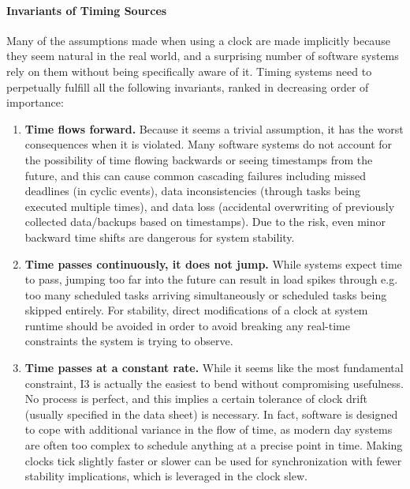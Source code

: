 \paragraph*{Invariants of Timing Sources} Many of the assumptions made when using a clock are made implicitly because they seem natural in the real world, and a surprising number of software systems rely on them without being specifically aware of it. Timing systems need to perpetually fulfill all the following invariants, ranked in decreasing order of importance:

\begin{enumerate}[label=I\arabic*.]
    \item \textbf{Time flows forward.} Because it seems a trivial assumption, it has the worst consequences when it is violated. Many software systems do not account for the possibility of time flowing backwards or seeing timestamps from the future, and this can cause common cascading failures including missed deadlines (in cyclic events), data inconsistencies (through tasks being executed multiple times), and data loss (accidental overwriting of previously collected data/backups based on timestamps). Due to the risk, even minor backward time shifts are dangerous for system stability.
    \item \textbf{Time passes continuously, it does not jump.} While systems expect time to pass, jumping too far into the future can result in load spikes through e.g. too many scheduled tasks arriving simultaneously or scheduled tasks being skipped entirely. For stability, direct modifications of a clock at system runtime should be avoided in order to avoid breaking any real-time constraints the system is trying to observe.
    \item \textbf{Time passes at a constant rate.} While it seems like the most fundamental constraint, I3 is actually the easiest to bend without compromising usefulness. No process is perfect, and this implies a certain tolerance of clock drift (usually specified in the data sheet) is necessary. In fact, software is designed to cope with additional variance in the flow of time, as modern day systems are often too complex to schedule anything at a precise point in time. Making clocks tick slightly faster or slower can be used for synchronization with fewer stability implications, which is leveraged in the clock slew.
    \setcounter{errorConditions}{\value{enumi}}
\end{enumerate}

